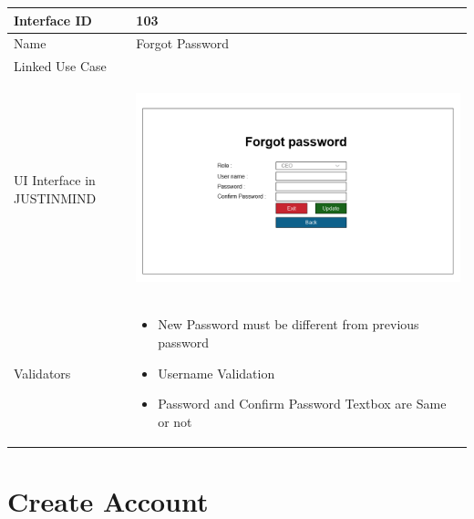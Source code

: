 \documentclass[12pt,a4paper]{report}
\begin{document}
\begin{tabular}{ | m{3cm} | m{12cm}| } \hline

Interface ID &  103 \\\hline

Name  	      & Forgot Password  \\ \hline

Linked Use Case &  \\ \hline

UI Interface in JUSTINMIND & \begin{center} \includegraphics[scale=0.3]{./UIs for Latex Reports/UI-003 Forgot password@1x.png}\end{center}  \\ \hline

Validators & 
\begin{itemize}
\item  New Password must be different from previous password
\item  Username Validation
\item  Password and Confirm Password Textbox are Same or not
\end{itemize}
\\ \hline

\end{tabular} 
\section{Create Account }
\end{document}
